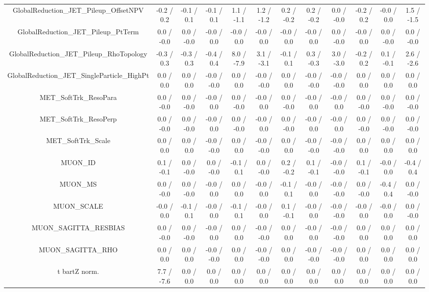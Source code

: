 \begin{table}[htbp]
\begin{center}
\begin{tabular}{|c|c|c|c|c|c|c|c|c|c|c|c|}
  GlobalReduction_JET_Pileup_OffsetNPV & -0.2 / 0.2 & -0.1 / 0.1 & -0.1 / 0.1 & 1.1 / -1.1 & 1.2 / -1.2 & 0.2 / -0.2 & 0.2 / -0.2 & 0.0 / -0.0 & -0.2 / 0.2 & -0.0 / 0.0 & 1.5 / -1.5 \\ 
  GlobalReduction_JET_Pileup_PtTerm & 0.0 / -0.0 & 0.0 / -0.0 & -0.0 / 0.0 & -0.0 / 0.0 & -0.0 / 0.0 & -0.0 / 0.0 & -0.0 / 0.0 & 0.0 / -0.0 & -0.0 / 0.0 & 0.0 / -0.0 & 0.0 / -0.0 \\ 
  GlobalReduction_JET_Pileup_RhoTopology & -0.3 / 0.3 & -0.3 / 0.3 & -0.4 / 0.4 & 8.0 / -7.9 & 3.1 / -3.1 & -0.1 / 0.1 & 0.3 / -0.3 & 3.0 / -3.0 & -0.2 / 0.2 & 0.1 / -0.1 & 2.6 / -2.6 \\ 
  GlobalReduction_JET_SingleParticle_HighPt & 0.0 / 0.0 & 0.0 / 0.0 & -0.0 / -0.0 & 0.0 / 0.0 & -0.0 / -0.0 & 0.0 / 0.0 & -0.0 / -0.0 & -0.0 / -0.0 & 0.0 / 0.0 & 0.0 / 0.0 & 0.0 / 0.0 \\ 
  MET_SoftTrk_ResoPara & 0.0 / -0.0 & 0.0 / -0.0 & -0.0 / 0.0 & 0.0 / -0.0 & -0.0 / 0.0 & 0.0 / -0.0 & -0.0 / 0.0 & -0.0 / 0.0 & 0.0 / -0.0 & 0.0 / -0.0 & 0.0 / -0.0 \\ 
  MET_SoftTrk_ResoPerp & 0.0 / -0.0 & 0.0 / -0.0 & -0.0 / 0.0 & 0.0 / -0.0 & -0.0 / 0.0 & 0.0 / -0.0 & -0.0 / 0.0 & -0.0 / 0.0 & 0.0 / -0.0 & 0.0 / -0.0 & 0.0 / -0.0 \\ 
  MET_SoftTrk_Scale & 0.0 / 0.0 & 0.0 / 0.0 & -0.0 / -0.0 & 0.0 / 0.0 & -0.0 / -0.0 & 0.0 / 0.0 & -0.0 / -0.0 & -0.0 / -0.0 & 0.0 / 0.0 & 0.0 / 0.0 & 0.0 / 0.0 \\ 
  MUON_ID & 0.1 / -0.1 & 0.0 / -0.0 & 0.0 / -0.0 & -0.1 / 0.1 & 0.0 / -0.0 & 0.2 / -0.2 & 0.1 / -0.1 & -0.0 / -0.0 & 0.1 / -0.1 & -0.0 / 0.0 & -0.4 / 0.4 \\ 
  MUON_MS & 0.0 / -0.0 & 0.0 / -0.0 & -0.0 / 0.0 & 0.0 / 0.0 & -0.0 / 0.0 & -0.1 / 0.1 & -0.0 / 0.0 & -0.0 / -0.0 & 0.0 / -0.0 & -0.4 / 0.4 & 0.0 / -0.0 \\ 
  MUON_SCALE & -0.0 / 0.0 & -0.1 / 0.1 & -0.0 / 0.0 & -0.1 / 0.1 & -0.0 / 0.0 & 0.1 / -0.1 & -0.0 / 0.0 & -0.0 / -0.0 & -0.0 / 0.0 & -0.0 / 0.0 & 0.0 / -0.0 \\ 
  MUON_SAGITTA_RESBIAS & 0.0 / -0.0 & 0.0 / -0.0 & -0.0 / 0.0 & 0.0 / 0.0 & -0.0 / -0.0 & 0.0 / 0.0 & -0.0 / 0.0 & -0.0 / -0.0 & 0.0 / 0.0 & 0.0 / 0.0 & 0.0 / 0.0 \\ 
  MUON_SAGITTA_RHO & 0.0 / 0.0 & 0.0 / 0.0 & -0.0 / -0.0 & 0.0 / 0.0 & -0.0 / -0.0 & 0.0 / 0.0 & -0.0 / -0.0 & -0.0 / -0.0 & 0.0 / 0.0 & 0.0 / 0.0 & 0.0 / 0.0 \\ 
  t bar{t}Z norm. & 7.7 / -7.6 & 0.0 / 0.0 & 0.0 / 0.0 & 0.0 / 0.0 & 0.0 / 0.0 & 0.0 / 0.0 & 0.0 / 0.0 & 0.0 / 0.0 & 0.0 / 0.0 & 0.0 / 0.0 & 0.0 / 0.0 \\ 

\end{tabular}
\end{center}
\end{table}
